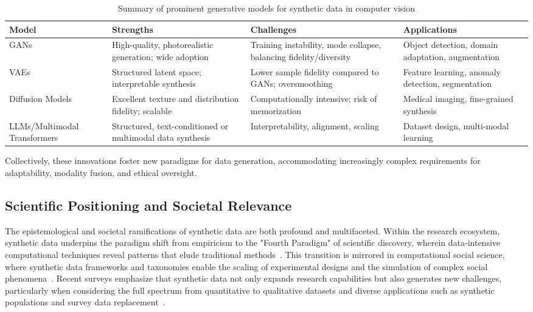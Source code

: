 \documentclass[sigconf]{acmart}
\begin{document}
\begin{table*}[htbp]
\centering
\caption{Summary of prominent generative models for synthetic data in computer vision}
\label{tab:gen_model_summary}
\begin{adjustbox}{max width=\textwidth}
\begin{tabular}{llll}
\toprule
\textbf{Model} & \textbf{Strengths} & \textbf{Challenges} & \textbf{Applications} \\
\midrule
GANs & High-quality, photorealistic generation; wide adoption & Training instability, mode collapse, balancing fidelity/diversity & Object detection, domain adaptation, augmentation \\
VAEs & Structured latent space; interpretable synthesis & Lower sample fidelity compared to GANs; oversmoothing & Feature learning, anomaly detection, segmentation \\
Diffusion Models & Excellent texture and distribution fidelity; scalable & Computationally intensive; risk of memorization & Medical imaging, fine-grained synthesis \\
LLMs/Multimodal Transformers & Structured, text-conditioned or multimodal data synthesis & Interpretability, alignment, scaling & Dataset design, multi-modal learning \\
\bottomrule
\end{tabular}
\end{adjustbox}
\end{table*}

Collectively, these innovations foster new paradigms for data generation, accommodating increasingly complex requirements for adaptability, modality fusion, and ethical oversight.

\subsection{Scientific Positioning and Societal Relevance}

The epistemological and societal ramifications of synthetic data are both profound and multifaceted. Within the research ecosystem, synthetic data underpins the paradigm shift from empiricism to the "Fourth Paradigm" of scientific discovery, wherein data-intensive computational techniques reveal patterns that elude traditional methods~\cite{ref13,ref14,ref33,ref87}. This transition is mirrored in computational social science, where synthetic data frameworks and taxonomies enable the scaling of experimental designs and the simulation of complex social phenomena~\cite{ref14,ref22,ref87}. Recent surveys emphasize that synthetic data not only expands research capabilities but also generates new challenges, particularly when considering the full spectrum from quantitative to qualitative datasets and diverse applications such as synthetic populations and survey data replacement~\cite{ref87}.
\end{document}
